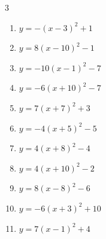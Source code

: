 \begin{multicols}{3}
\begin{enumerate}
        \phantom{$\displaystyle 頂点\left( 7 , -2 \right)$}

  \item $\displaystyle y=-\left( x-3\right)^{2}+1$

        \phantom{$\displaystyle 頂点\left( 3 , 1 \right)$}

  \item $\displaystyle y=8\left( x-10\right)^{2}-1$

        \phantom{$\displaystyle 頂点\left( 10 , -1 \right)$}

  \item $\displaystyle y=-10\left( x-1\right)^{2}-7$

        \phantom{$\displaystyle 頂点\left( 1 , -7 \right)$}

  \item $\displaystyle y=-6\left( x+10\right)^{2}-7$

        \phantom{$\displaystyle 頂点\left( -10 , -7 \right)$}

  \item $\displaystyle y=7\left( x+7\right)^{2}+3$

        \phantom{$\displaystyle 頂点\left( -7 , 3 \right)$}

  \item $\displaystyle y=-4\left( x+5\right)^{2}-5$

        \phantom{$\displaystyle 頂点\left( -5 , -5 \right)$}

  \item $\displaystyle y=4\left( x+8\right)^{2}-4$

        \phantom{$\displaystyle 頂点\left( -8 , -4 \right)$}

  \item $\displaystyle y=4\left( x+10\right)^{2}-2$

        \phantom{$\displaystyle 頂点\left( -10 , -2 \right)$}

  \item $\displaystyle y=8\left( x-8\right)^{2}-6$

        \phantom{$\displaystyle 頂点\left( 8 , -6 \right)$}

  \item $\displaystyle y=-6\left( x+3\right)^{2}+10$

        \phantom{$\displaystyle 頂点\left( -3 , 10 \right)$}

  \item $\displaystyle y=7\left( x-1\right)^{2}+4$

        \phantom{$\displaystyle 頂点\left( 1 , 4 \right)$}


\end{enumerate}
\end{multicols}
